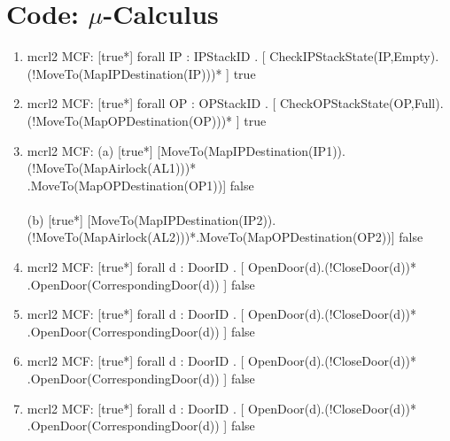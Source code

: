 \documentclass[a4paper,12pt]{article}
\begin{document}
	\section{Code: $\mu$-Calculus}
	\begin{enumerate}
		
		\item mcrl2 MCF: [true*] forall IP : IPStackID . [ CheckIPStackState(IP,Empty).
		\\(!MoveTo(MapIPDestination(IP)))* ] true
		
		\item mcrl2 MCF: [true*] forall OP : OPStackID . [ CheckOPStackState(OP,Full).
		\\(!MoveTo(MapOPDestination(OP)))* ] true
		
		
		\item mcrl2 MCF: (a) [true*] [MoveTo(MapIPDestination(IP1)). (!MoveTo(MapAirlock(AL1)))*
		\\.MoveTo(MapOPDestination(OP1))] false
		\\
		\\ (b) [true*] [MoveTo(MapIPDestination(IP2)). (!MoveTo(MapAirlock(AL2)))*.MoveTo(MapOPDestination(OP2))] false
		
		
		
		
		\item mcrl2 MCF: [true*] forall d : DoorID . [ OpenDoor(d).(!CloseDoor(d))*
		\\.OpenDoor(CorrespondingDoor(d)) ] false
		
		\item mcrl2 MCF: [true*] forall d : DoorID . [ OpenDoor(d).(!CloseDoor(d))*
		\\.OpenDoor(CorrespondingDoor(d)) ] false
		
		\item mcrl2 MCF: [true*] forall d : DoorID . [ OpenDoor(d).(!CloseDoor(d))*
		\\.OpenDoor(CorrespondingDoor(d)) ] false
		
		\item mcrl2 MCF: [true*] forall d : DoorID . [ OpenDoor(d).(!CloseDoor(d))*
		\\.OpenDoor(CorrespondingDoor(d)) ] false
		

\end{enumerate}
\end{document}
